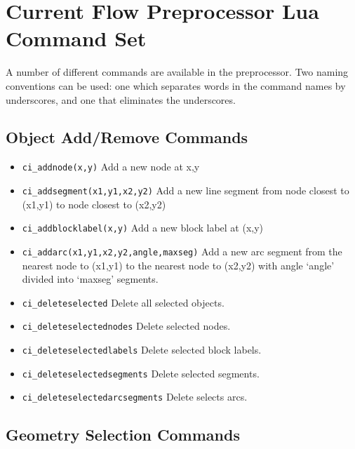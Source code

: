 \section{Current Flow Preprocessor Lua Command Set}

A number of different commands are available in the preprocessor.
Two naming conventions can be used: one which separates words in
the command names by underscores, and one that eliminates the
underscores.

\subsection{Object Add/Remove Commands}
\begin{itemize}
\item {\tt ci\_addnode(x,y)} Add a new node at x,y

\item {\tt ci\_addsegment(x1,y1,x2,y2)} Add a new line segment from node closest to
(x1,y1) to node closest to (x2,y2)

\item {\tt ci\_addblocklabel(x,y)} Add a new block label at (x,y)

\item {\tt ci\_addarc(x1,y1,x2,y2,angle,maxseg)} Add a new arc segment from the
nearest node to (x1,y1) to the nearest node to (x2,y2) with angle `angle'
divided into `maxseg' segments.

\item {\tt ci\_deleteselected} Delete all selected objects.

\item {\tt ci\_deleteselectednodes} Delete selected nodes.

\item {\tt ci\_deleteselectedlabels} Delete selected block labels.

\item {\tt ci\_deleteselectedsegments} Delete selected segments.

\item {\tt ci\_deleteselectedarcsegments} Delete selects arcs.
\end{itemize}


\subsection{Geometry Selection Commands}

